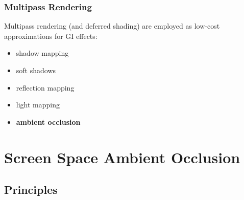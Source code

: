 \documentclass{beamer}
\begin{document}
\begin{frame}%
\frametitle{Multipass Rendering}
Multipass rendering (and deferred shading) are employed as low-cost approximations for GI effects:
\begin{itemize}
    \item shadow mapping
    \item soft shadows
    \item reflection mapping
    \item light mapping
    \item \textbf{ambient occlusion}
\end{itemize}


\end{frame}


\section{Screen Space Ambient Occlusion}

\subsection{Principles}
\end{document}
